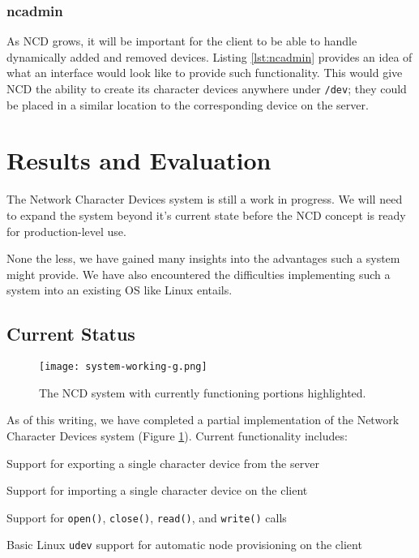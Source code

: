 \documentclass[11pt,twocolumn]{article}
\newenvironment{packed_item}{
\begin{itemize}
  \setlength{\itemsep}{1pt}
  \setlength{\parskip}{0pt}
  \setlength{\parsep}{0pt}
}{\end{itemize}}
\begin{document}
\subsubsection{ncadmin}



As NCD grows, it will be important for the client to be able to handle
dynamically added and removed devices. Listing \ref{lst:ncadmin}
provides an idea of what an interface would look like to provide such
functionality. This would give NCD the ability to create its character
devices anywhere under \texttt{/dev}; they could be placed in a similar
location to the corresponding device on the server.


\section{Results and Evaluation}
\label{sec:results}

The Network Character Devices system is still a work in
progress. We will need to expand the system beyond it's current state
before the NCD concept is ready for production-level use.

None the less, we have gained many insights into the advantages such a
system might provide. We have also encountered the difficulties
implementing such a system into an existing OS like Linux entails.

\subsection{Current Status}
\label{sec:currentstatus}

\begin{figure}[h]
  \centering
  \texttt{[image: system-working-g.png]}
  \caption{The NCD system with currently functioning portions
    highlighted.}
  \label{fig:system-working}
\end{figure}

As of this writing, we have completed a partial implementation of
the Network Character Devices system (Figure
\ref{fig:system-working}). Current functionality includes:

\begin{packed_item}
\item Support for exporting a single character device from the server
\item Support for importing a single character device on the client
\item Support for \texttt{open()}, \texttt{close()}, \texttt{read()},
  and \texttt{write()} calls
\item Basic Linux \texttt{udev} support for automatic node
  provisioning on the client
\end{packed_item}
\end{document}
